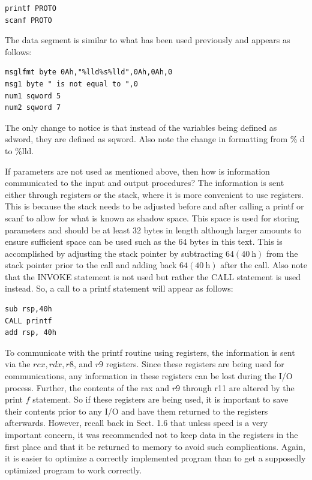 \documentclass[10pt]{book}
\begin{document}
\begin{center}
\begin{center}
\begin{center}
\begin{center}
\begin{verbatim}
printf PROTO
scanf PROTO
\end{verbatim}

The data segment is similar to what has been used previously and appears as follows:

\begin{verbatim}
msglfmt byte 0Ah,"%lld%s%lld",0Ah,0Ah,0
msg1 byte " is not equal to ",0
num1 sqword 5
num2 sqword 7
\end{verbatim}

The only change to notice is that instead of the variables being defined as sdword, they are defined as sqword. Also note the change in formatting from \% d to \%lld.

If parameters are not used as mentioned above, then how is information communicated to the input and output procedures? The information is sent either through registers or the stack, where it is more convenient to use registers. This is because the stack needs to be adjusted before and after calling a printf or scanf to allow for what is known as shadow space. This space is used for storing parameters and should be at least 32 bytes in length although larger amounts to ensure sufficient space can be used such as the 64 bytes in this text. This is accomplished by adjusting the stack pointer by subtracting $64(40 \mathrm{~h})$ from the stack pointer prior to the call and adding back $64(40 \mathrm{~h})$ after the call. Also note that the INVOKE statement is not used but rather the CALL statement is used instead. So, a call to a printf statement will appear as follows:

\begin{verbatim}
sub rsp,40h
CALL printf
add rsp, 40h
\end{verbatim}

To communicate with the printf routine using registers, the information is sent via the $r c x, r d x, r 8$, and $r 9$ registers. Since these registers are being used for communications, any information in these registers can be lost during the I/O process. Further, the contents of the rax and $r 9$ through r11 are altered by the print $f$ statement. So if these registers are being used, it is important to save their contents prior to any I/O and have them returned to the registers afterwards. However, recall back in Sect. 1.6 that unless speed is a very important concern, it was recommended not to keep data in the registers in the first place and that it be returned to memory to avoid such complications. Again, it is easier to optimize a correctly implemented program than to get a supposedly optimized program to work correctly.


\end{center}
\end{center}
\end{center}
\end{center}
\end{document}
